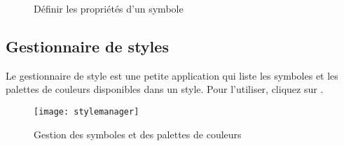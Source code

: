 \begin{figure}[ht]
\centering
   \hspace{1cm}
   \hspace{1cm}
\caption{Définir les propriétés d'un symbole \nixcaption}
\end{figure}

\subsection{Gestionnaire de styles}\label{subsec:stylemanager}

Le gestionnaire de style est une petite application qui liste les symboles et les palettes de couleurs disponibles dans un style. Pour l'utiliser, cliquez sur  \arrow {}.

\begin{figure}[ht]
   \centering
   \texttt{[image: stylemanager]}
   \caption{Gestion des symboles et des palettes de couleurs \nixcaption}\label{fig:stylemanager}
\end{figure}


